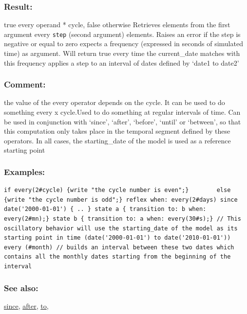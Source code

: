 \documentclass[]{book}
\theoremstyle{definition}
\theoremstyle{definition}
\theoremstyle{definition}
\theoremstyle{remark}
\begin{document}
\subsubsection{Result:}\label{result-152}

true every operand * cycle, false otherwise Retrieves elements from the
first argument every \texttt{step} (second argument) elements. Raises an
error if the step is negative or equal to zero expects a frequency
(expressed in seconds of simulated time) as argument. Will return true
every time the current\_date matches with this frequency applies a step
to an interval of dates defined by `date1 to date2'

\subsubsection{Comment:}\label{comment-34}

the value of the every operator depends on the cycle. It can be used to
do something every x cycle.Used to do something at regular intervals of
time. Can be used in conjunction with `since', `after', `before',
`until' or `between', so that this computation only takes place in the
temporal segment defined by these operators. In all cases, the
starting\_date of the model is used as a reference starting point

\subsubsection{Examples:}\label{examples-117}

\begin{verbatim}
if every(2#cycle) {write "the cycle number is even";}        else {write "the cycle number is odd";} reflex when: every(2#days) since date('2000-01-01') { .. } state a { transition to: b when: every(2#mn);} state b { transition to: a when: every(30#s);} // This oscillatory behavior will use the starting_date of the model as its starting point in time (date('2000-01-01') to date('2010-01-01')) every (#month) // builds an interval between these two dates which contains all the monthly dates starting from the beginning of the interval 
\end{verbatim}

\subsubsection{See also:}\label{see-also-88}

\href{operators-s-to-z.html\#since}{since},
\href{operators-a-to-a.html\#after}{after},
\href{operators-s-to-z.html\#to}{to},
\end{document}
